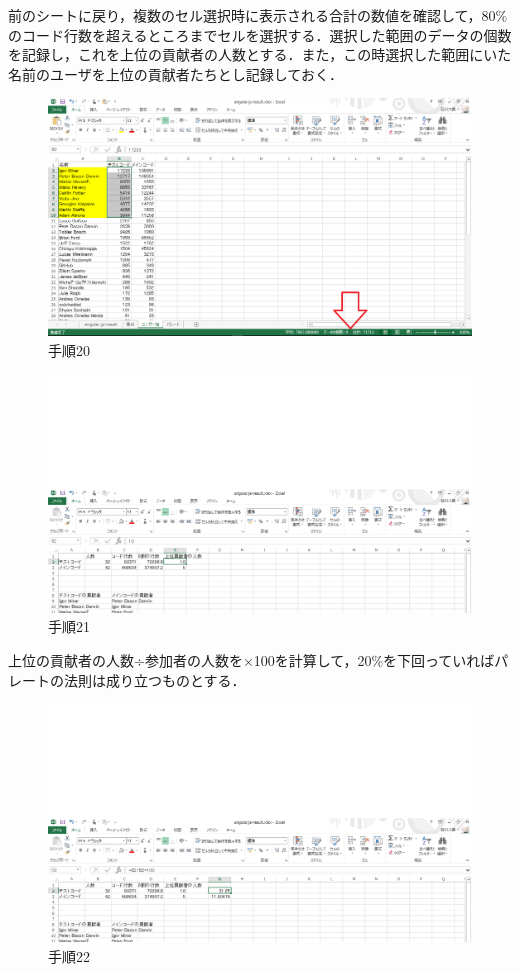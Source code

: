 \newpage

前のシートに戻り，複数のセル選択時に表示される合計の数値を確認して，80\%のコード行数を超えるところまでセルを選択する．選択した範囲のデータの個数を記録し，これを上位の貢献者の人数とする．また，この時選択した範囲にいた名前のユーザを上位の貢献者たちとし記録しておく．

\begin{figure}[h]
\centering
\includegraphics[width=13cm]{process20.png}
\caption{手順20}
\end{figure}

\begin{figure}[h]
\centering
\includegraphics[width=13cm]{process21.png}
\caption{手順21}
\end{figure}

\newpage

上位の貢献者の人数÷参加者の人数を×100を計算して，20\%を下回っていればパレートの法則は成り立つものとする．

\begin{figure}[h]
\centering
\includegraphics[width=13cm]{process22.png}
\caption{手順22}
\end{figure}

